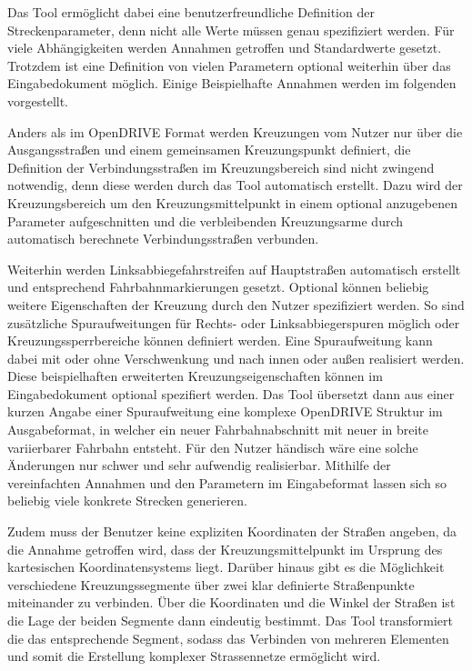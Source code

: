 Das Tool ermöglicht dabei eine benutzerfreundliche Definition der Streckenparameter, denn nicht alle Werte müssen genau spezifiziert werden. Für viele Abhängigkeiten werden Annahmen getroffen und Standardwerte gesetzt. Trotzdem ist eine Definition von vielen Parametern optional weiterhin über das Eingabedokument möglich. Einige Beispielhafte Annahmen werden im folgenden vorgestellt.

Anders als im OpenDRIVE Format werden Kreuzungen vom Nutzer nur über die Ausgangsstraßen und einem gemeinsamen Kreuzungspunkt definiert, die Definition der Verbindungsstraßen im Kreuzungsbereich sind nicht zwingend notwendig, denn diese werden durch das Tool automatisch erstellt. Dazu wird der Kreuzungsbereich um den Kreuzungsmittelpunkt in einem optional anzugebenen Parameter aufgeschnitten und die verbleibenden Kreuzungsarme durch automatisch berechnete Verbindungsstraßen verbunden.

Weiterhin werden Linksabbiegefahrstreifen auf Hauptstraßen automatisch erstellt und entsprechend Fahrbahnmarkierungen gesetzt. Optional können beliebig weitere Eigenschaften der Kreuzung durch den Nutzer spezifiziert werden. So sind zusätzliche Spuraufweitungen für Rechts- oder Linksabbiegerspuren möglich oder Kreuzungssperrbereiche können definiert werden. Eine Spuraufweitung kann dabei mit oder ohne Verschwenkung und nach innen oder außen realisiert werden. Diese beispielhaften erweiterten Kreuzungseigenschaften können im Eingabedokument optional spezifiert werden. Das Tool übersetzt dann aus einer kurzen Angabe einer Spuraufweitung eine komplexe OpenDRIVE Struktur im Ausgabeformat, in welcher ein neuer Fahrbahnabschnitt mit neuer in breite variierbarer Fahrbahn entsteht. Für den Nutzer händisch wäre eine solche Änderungen nur schwer und sehr aufwendig realisierbar. Mithilfe der vereinfachten Annahmen und den Parametern im Eingabeformat lassen sich so beliebig viele konkrete Strecken generieren.

Zudem muss der Benutzer keine expliziten Koordinaten der Straßen angeben, da die Annahme getroffen wird, dass der Kreuzungsmittelpunkt im Ursprung des kartesischen Koordinatensystems liegt. Darüber hinaus gibt es die Möglichkeit verschiedene Kreuzungssegmente über zwei klar definierte Straßenpunkte miteinander zu verbinden. Über die Koordinaten und die Winkel der Straßen ist die Lage der beiden Segmente dann eindeutig bestimmt. Das Tool transformiert die das entsprechende Segment, sodass das Verbinden von mehreren Elementen und somit die Erstellung komplexer Strassennetze ermöglicht wird.

